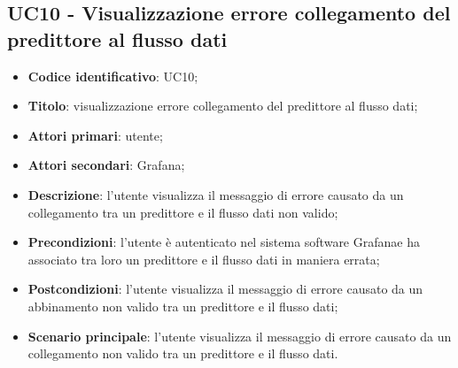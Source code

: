 \subsection{UC10 - Visualizzazione errore collegamento del predittore al flusso dati}
\begin{itemize}
    \item \textbf{Codice identificativo}: UC10;
    \item \textbf{Titolo}: visualizzazione errore collegamento del predittore al flusso dati;
    \item \textbf{Attori primari}: utente;
    \item \textbf{Attori secondari}: Grafana\glo;
    \item \textbf{Descrizione}: l'utente visualizza il messaggio di errore causato da un collegamento tra un predittore e il flusso dati non valido;
    \item \textbf{Precondizioni}: l'utente è autenticato nel sistema software Grafana\glosp e ha associato tra loro un predittore e il flusso dati in maniera errata;
    \item \textbf{Postcondizioni}: l'utente visualizza il messaggio di errore causato da un abbinamento non valido tra un predittore e il flusso dati;
    \item \textbf{Scenario principale}: l'utente visualizza il messaggio di errore causato da un collegamento non valido tra un predittore e il flusso dati.
\end{itemize}